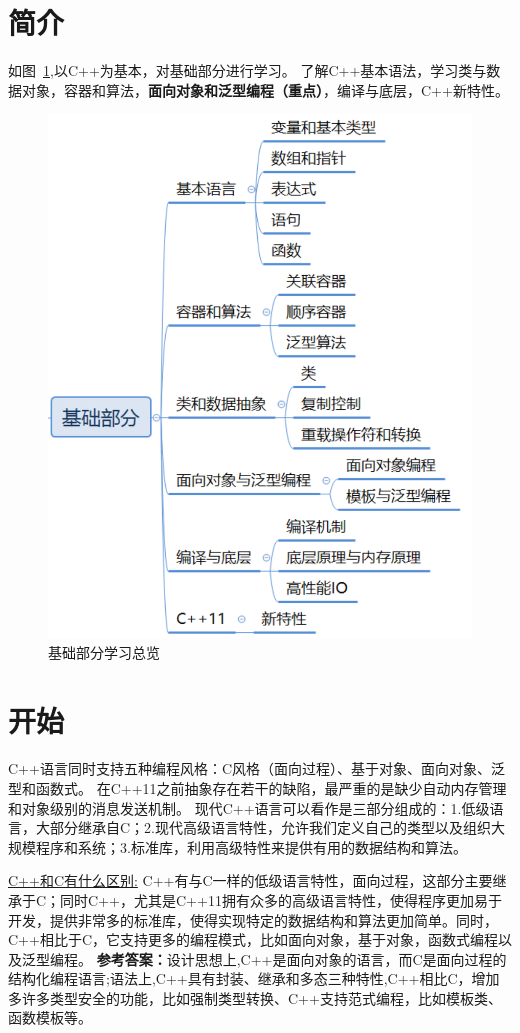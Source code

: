 \section{简介}

如图~\ref{fig:overview},以C++为基本，对基础部分进行学习。
了解C++基本语法，学习类与数据对象，容器和算法，\textbf{面向对象和泛型编程（重点）}，编译与底层，C++新特性。

\begin{figure}[]
	\centering
	\includegraphics[width=0.5\columnwidth]{pic/overview.png}
	\caption{基础部分学习总览}
	\label{fig:overview}
\end{figure}

\section{开始}
C++语言同时支持五种编程风格：C风格（面向过程）、基于对象、面向对象、泛型和函数式。
在C++11之前抽象存在若干的缺陷，最严重的是缺少自动内存管理和对象级别的消息发送机制。
现代C++语言可以看作是三部分组成的：1.低级语言，大部分继承自C；2.现代高级语言特性，允许我们定义自己的类型以及组织大规模程序和系统；3.标准库，利用高级特性来提供有用的数据结构和算法。
\begin{tcolorbox}[boxsep=-0.05in]
	\underline{C++和C有什么区别:} C++有与C一样的低级语言特性，面向过程，这部分主要继承于C；同时C++，尤其是C++11拥有众多的高级语言特性，使得程序更加易于开发，提供非常多的标准库，使得实现特定的数据结构和算法更加简单。同时，C++相比于C，它支持更多的编程模式，比如面向对象，基于对象，函数式编程以及泛型编程。
	\textbf{参考答案：}设计思想上,C++是面向对象的语言，而C是面向过程的结构化编程语言;语法上,C++具有封装、继承和多态三种特性,C++相比C，增加多许多类型安全的功能，比如强制类型转换、C++支持范式编程，比如模板类、函数模板等。
\end{tcolorbox}

